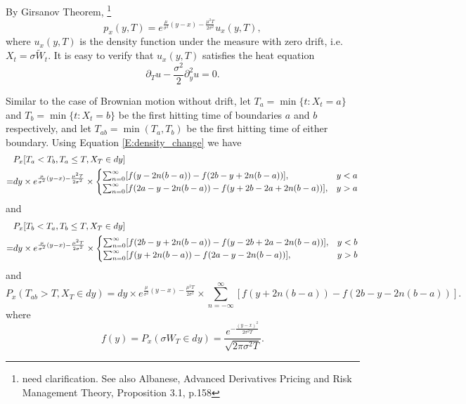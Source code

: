 By Girsanov Theorem, 
\footnote{\textdbend need clarification. See also Albanese, Advanced Derivatives
   Pricing and Risk Management Theory, Proposition 3.1, p.158}
\begin{equation} \label{E:density_change}
	p_x(y,T) = e^{\frac{\mu}{\sigma^2}(y-x)-\frac{\mu^2 T}{2\sigma^2}} u_x(y,T),
\end{equation}
where $u_x(y,T)$ is the density function under the measure with zero drift, i.e.
$X_t=\sigma \tilde{W}_t$. It is easy to verify that $u_x(y,T)$ satisfies the
heat equation
\[
   \partial_T u - \frac{\sigma^2}{2} \partial_y^2 u = 0.
\]

Similar to the case of Brownian motion without drift, 
let $T_a=\min \{t:X_t=a \}$ and $T_b=\min \{t:X_t=b \}$ be the first hitting
time of boundaries $a$ and $b$ respectively, and let $T_{ab}=\min(T_a,T_b)$ be
the first hitting time of either boundary. Using Equation \ref{E:density_change}
we have
\begin{align}
	 & P_x[T_a<T_b, T_a\le T, X_T\in dy]  \notag \\
	=& dy\times e^{\frac{\mu}{\sigma^2}(y-x)-\frac{\mu^2 T}{2\sigma^2}} \times
	   \begin{cases}
			 \sum_{n=0}^{\infty} [ f(y-2n(b-a)) - f(2b-y+2n(b-a)) ],         & y<a \\
			 \sum_{n=0}^{\infty} [ f(2a-y-2n(b-a)) - f(y+2b-2a + 2n(b-a)) ], & y>a
     \end{cases}
\end{align}
and
\begin{align}
	& P_x[T_b<T_a, T_b\le T, X_T\in dy]  \notag \\
	=& dy\times e^{\frac{\mu}{\sigma^2}(y-x)-\frac{\mu^2 T}{2\sigma^2}} \times
    \begin{cases}
			\sum_{n=0}^{\infty} [ f(2b-y+2n(b-a)) - f(y-2b+2a - 2n(b-a)) ], & y<b \\
			\sum_{n=0}^{\infty} [ f(y+2n(b-a)) - f(2a-y-2n(b-a)) ],  & y>b
    \end{cases}
\end{align}
and
\begin{equation} \label{E:prob_drift_notouch}
	P_x(T_{ab}>T, X_T\in dy)  
	= dy\times e^{\frac{\mu}{\sigma^2}(y-x)-\frac{\mu^2 T}{2\sigma^2}} \times
	  \sum_{n=-\infty}^{\infty} [ f(y+2n(b-a)) - f(2b-y-2n(b-a)) ].
\end{equation}
where
\[
	f(y) = P_x(\sigma W_T\in dy) 
	     = \frac{e^{-\frac{(y-x)^2}{2\sigma^2 T}}}{\sqrt{2\pi \sigma^2 T}}.
\]

